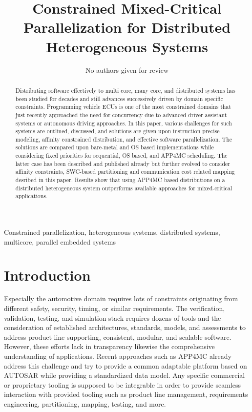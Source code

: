 \documentclass [a4paper,final,conference,10pt]{IDAACS}
\title{Constrained Mixed-Critical Parallelization for Distributed Heterogeneous Systems}
\author{
	No authors given for review
}
\begin{document}
\maketitle

\let\thefootnote\relax{}

\begin{abstract}
Distributing software effectively to multi core, many core, and distributed systems has been studied for decades and still advances successively driven by domain specific constraints. Programming vehicle ECUs is one of the most constrained domains that just recently approached the need for concurrency due to advanced driver assistant systems or autonomous driving approaches. In this paper, various challenges for such systems are outlined, discussed, and solutions are given upon instruction precise modeling, affinity constrained distribution, and effective software parallelization. The solutions are compared upon bare-metal and OS based implementations while considering fixed priorities for sequential, OS based, and APP4MC scheduling. The latter case has been described and published already but further evolved to consider affinity constraints, SWC-based partitioning and communication cost related mapping desribed in this paper. Results show that using APP4MC based distributions on a distributed heterogeneous system outperforms available approaches for mixed-critical applications.
\end{abstract}

\begin{IEEEkeywords}
Constrained parallelization, heterogeneous systems, distributed systems, multicore, parallel embedded systems
\end{IEEEkeywords}

\section{Introduction}
Especially the automotive domain requires lots of constraints originating from different safety, security, timing, or similar requirements. The verification, validation, testing, and simulation stack requires dozens of tools and the consideration of established architectures, standards, models, and assessments to address product line supporting, consistent, modular, and scalable software. However, these efforts lack in transparency likewise the comprehensive understanding of applications. Recent approaches such as APP4MC\cite{app4mc}
already address this challenge and try to provide a common adaptable platform based on AUTOSAR\cite{autosar} while providing a standardized data model. Any specific commercial or proprietary tooling is supposed to be integrable in order to provide seamless interaction with provided tooling such as product line management, requirements engineering, partitioning, mapping, testing, and more. 
\end{document}
